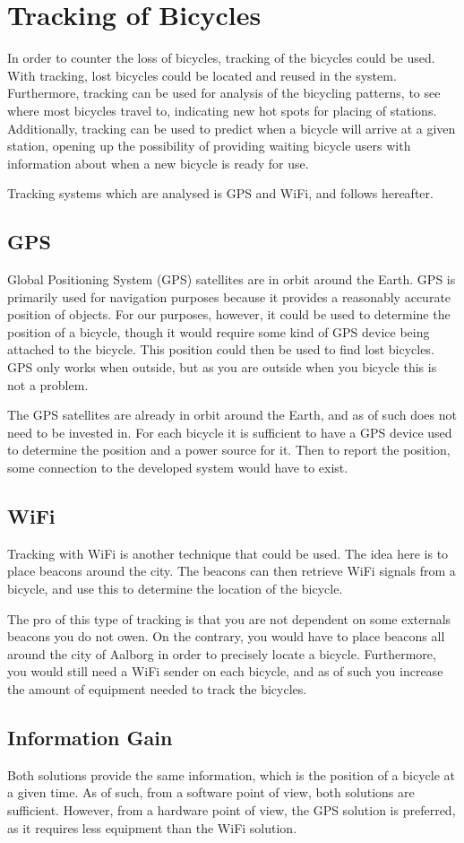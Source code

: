 \section{Tracking of Bicycles}
In order to counter the loss of bicycles, tracking of the bicycles could be used.
With tracking, lost bicycles could be located and reused in the system.
Furthermore, tracking can be used for analysis of the bicycling patterns, to see where most bicycles travel to, indicating new hot spots for placing of stations.
Additionally, tracking can be used to predict when a bicycle will arrive at a given station, opening up the possibility of providing waiting bicycle users with information about when a new bicycle is ready for use.

Tracking systems which are analysed is GPS and WiFi, and follows hereafter.
\subsection{GPS}
Global Positioning System (GPS) satellites are in orbit around the Earth.
GPS is primarily used for navigation purposes because it provides a reasonably accurate position of objects.
For our purposes, however, it could be used to determine the position of a bicycle, though it would require some kind of GPS device being attached to the bicycle.
This position could then be used to find lost bicycles.
GPS only works when outside, but as you are outside when you bicycle this is not a problem.

The GPS satellites are already in orbit around the Earth, and as of such does not need to be invested in. %
For each bicycle it is sufficient to have a GPS device used to determine the position and a power source for it.
Then to report the position, some connection to the developed system would have to exist.

\subsection{WiFi}
Tracking with WiFi is another technique that could be used.
The idea here is to place beacons around the city.
The beacons can then retrieve WiFi signals from a bicycle, and use this to determine the location of the bicycle.

The pro of this type of tracking is that you are not dependent on some externals beacons you do not owen.
On the contrary, you would have to place beacons all around the city of Aalborg in order to precisely locate a bicycle.
Furthermore, you would still need a WiFi sender on each bicycle, and as of such you increase the amount of equipment needed to track the bicycles.

\subsection{Information Gain}
Both solutions provide the same information, which is the position of a bicycle at a given time.
As of such, from a software point of view, both solutions are sufficient.
However, from a hardware point of view, the GPS solution is preferred, as it requires less equipment than the WiFi solution.